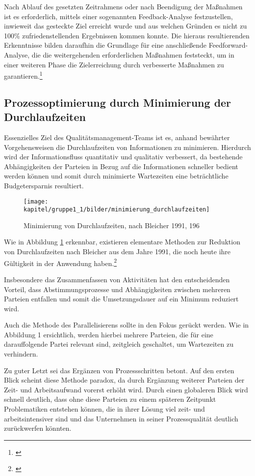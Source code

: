 Nach Ablauf des gesetzten Zeitrahmens oder nach Beendigung der Maßnahmen ist es erforderlich, mittels einer sogenannten Feedback-Analyse festzustellen, inwieweit das gesteckte Ziel erreicht wurde und aus welchen Gründen es nicht zu 100\% zufriedenstellenden Ergebnissen kommen konnte. Die hieraus resultierenden Erkenntnisse bilden daraufhin die Grundlage für eine anschließende Feedforward-Analyse, die die weitergehenden erforderlichen Maßnahmen feststeckt, um in einer weiteren Phase die Zielerreichung durch verbesserte Maßnahmen zu garantieren.\footnote{\cite{gadatsch_it-controlling_2012}}

\subsection{Prozessoptimierung durch Minimierung der Durchlaufzeiten}
Essenzielles Ziel des Qualitätsmanagement-Teams ist es, anhand bewährter Vorgehensweisen die Durchlaufzeiten von Informationen zu minimieren. Hierdurch wird der Informationsfluss quantitativ und qualitativ verbessert, da bestehende Abhängigkeiten der Parteien in Bezug auf die Informationen schneller bedient werden können und somit durch minimierte Wartezeiten eine beträchtliche Budgetersparnis resultiert. 

\begin{figure}[h!]
	\centering
	\texttt{[image: kapitel/gruppe1\_1/bilder/minimierung\_durchlaufzeiten]}
	\caption{Minimierung von Durchlaufzeiten, nach Bleicher 1991, 196}
	\label{fig_minimierung_durchlaufzeiten}
\end{figure}

Wie in Abbildung \ref{fig_minimierung_durchlaufzeiten} erkennbar, existieren elementare Methoden zur Reduktion von Durchlaufzeiten nach Bleicher aus dem Jahre 1991, die noch heute ihre Gültigkeit in der Anwendung haben.\footnote{\cite{bleicher_organisation_1991}}

Insbesondere das Zusammenfassen von Aktivitäten hat den entscheidenden Vorteil, dass Abstimmungsprozesse und Abhängigkeiten zwischen mehreren Parteien entfallen und somit die Umsetzungsdauer auf ein Minimum reduziert wird. 

Auch die Methode des Parallelisierens sollte in den Fokus gerückt werden. Wie in Abbildung 1 ersichtlich, werden hierbei mehrere Parteien, die für eine darauffolgende Partei relevant sind, zeitgleich geschaltet, um Wartezeiten zu verhindern. 

Zu guter Letzt sei das Ergänzen von Prozessschritten betont. Auf den ersten Blick scheint diese Methode paradox, da durch Ergänzung weiterer Parteien der Zeit- und Arbeitsaufwand vorerst erhöht wird. Durch einen globaleren Blick wird schnell deutlich, dass ohne diese Parteien zu einem späteren Zeitpunkt Problematiken entstehen können, die in ihrer Lösung viel zeit- und arbeitsintensiver sind und das Unternehmen in seiner Prozessqualität deutlich zurückwerfen könnten.

